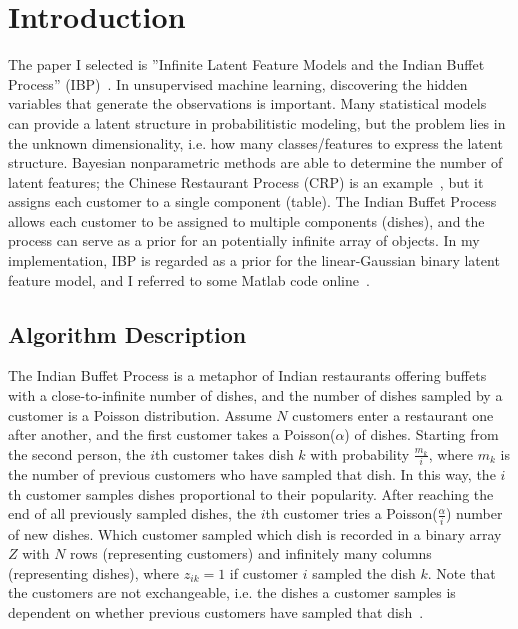 \section{Introduction}
 \label{sec:intro}
 
The paper I selected is ''Infinite Latent Feature Models and the Indian Buffet Process'' (IBP)~\cite{griffiths2005infinite}. In unsupervised machine learning, discovering the hidden variables that generate the observations is important. Many statistical models~\cite{blei2003latent, gershman2012tutorial} can provide a latent structure in probabilitistic modeling, but the problem lies in the unknown dimensionality, i.e. how many classes/features to express the latent structure. Bayesian nonparametric methods are able to determine the number of latent features; the Chinese Restaurant Process (CRP) is an example~\cite{crp2004hierarchical}, but it assigns each customer to a single component (table). The Indian Buffet Process allows each customer to be assigned to multiple components (dishes), and the process can serve as a prior for an potentially infinite array of objects. In my implementation, IBP is regarded as a prior for the linear-Gaussian binary latent feature model, and I referred to some Matlab code online~\cite{ibp2012matlab, ibp2012code}.

\subsection{Algorithm Description}
\label{sub:IBPalg}
The Indian Buffet Process is a metaphor of Indian restaurants offering buffets with a close-to-infinite number of dishes, and the number of dishes sampled by a customer is a Poisson distribution. Assume $N$ customers enter a restaurant one after another, and the first customer takes a Poisson($\alpha$) of dishes. Starting from the second person, the $i$th customer takes dish $k$ with probability $\frac{m_k}{i}$, where $m_k$ is the number of previous customers who have sampled that dish. In this way, the $i$th customer samples dishes proportional to their popularity. After reaching the end of all previously sampled dishes, the $i$th customer tries a Poisson($\frac{\alpha}{i}$) number of new dishes. Which customer sampled which dish is recorded in a binary array $Z$ with $N$ rows (representing customers) and infinitely many columns (representing dishes), where $z_{ik} = 1$ if customer $i$ sampled the dish $k$. Note that the customers are not exchangeable, i.e. the dishes a customer samples is dependent on whether previous customers have sampled that dish~\cite{griffiths2005infinite}.\\ 

